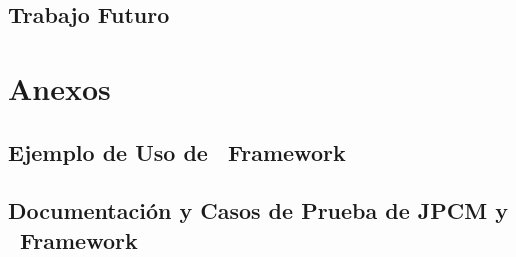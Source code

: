 \documentclass{report}
\begin{document}
        \chapter{Trabajo Futuro}
            

    \part{Anexos}
        \chapter{Ejemplo de Uso de \nombreFramework \ Framework}
            
        \chapter{Documentación y Casos de Prueba de JPCM y \nombreFramework \ Framework}
            
    
	
	
\end{document}
